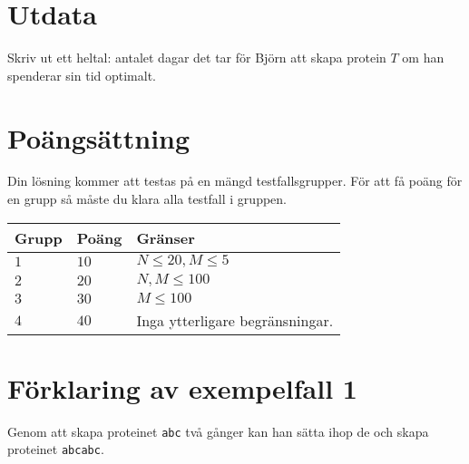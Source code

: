 \section*{Utdata}
Skriv ut ett heltal: antalet dagar det tar för Björn att skapa protein $T$ om han spenderar sin tid optimalt.


\section*{Poängsättning}
Din lösning kommer att testas på en mängd testfallsgrupper.
För att få poäng för en grupp så måste du klara alla testfall i gruppen.

\noindent
\begin{tabular}{| l | l | p{12cm} |}
  \hline
  \textbf{Grupp} & \textbf{Poäng} & \textbf{Gränser} \\ \hline
  $1$    & $10$       & $N \leq 20, M \leq 5$ \\ \hline
  $2$    & $20$       & $N, M \leq 100$ \\ \hline
  $3$    & $30$       & $M \leq 100$ \\ \hline
  $4$    & $40$       & Inga ytterligare begränsningar. \\ \hline
\end{tabular}

\section*{Förklaring av exempelfall 1}
Genom att skapa proteinet \texttt{abc} två gånger kan han sätta ihop de och skapa proteinet \texttt{abcabc}.
